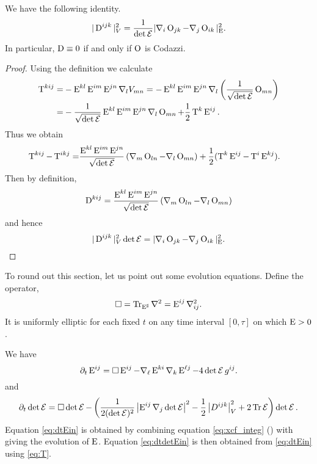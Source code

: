 \documentclass[a4paper,12pt]{amsart}
\begin{document}
\begin{lemma}
\label{lem:cubicform_codazzi}

We have the following identity.
\[
|\operatorname{D}^{ijk}|_V^2=\frac{1}{\det\operatorname{\mathcal{E}}}|\nabla_i\operatorname{O}_{jk}-\nabla_j\operatorname{O}_{ik}|_{\operatorname{E}}^2.
\]
In particular, \(\operatorname{D}\equiv 0\) if and only if \(\operatorname{O}\) is Codazzi.
\end{lemma}

\begin{proof}
Using the definition we calculate
\begin{align*}
\operatorname{T}^{kij}=&-\operatorname{E}^{kl}\operatorname{E}^{im}\operatorname{E}^{jn}\nabla_l V_{mn} = -\operatorname{E}^{kl}\operatorname{E}^{im}\operatorname{E}^{jn}\nabla_l \left(\frac{1}{\sqrt{\det\operatorname{\mathcal{E}}}} \operatorname{O}_{mn}\right)\\
=&-\frac{1}{\sqrt{\det\operatorname{\mathcal{E}}}}\operatorname{E}^{kl}\operatorname{E}^{im}\operatorname{E}^{jn}\nabla_l \operatorname{O}_{mn}+\frac{1}{2}\operatorname{T}^k\operatorname{E}^{ij}.
\end{align*}
Thus we obtain
\begin{align*}
\operatorname{T}^{kij}-\operatorname{T}^{ikj}=&\frac{\operatorname{E}^{kl}\operatorname{E}^{im}\operatorname{E}^{jn}}{\sqrt{\det\operatorname{\mathcal{E}}}}\left(\nabla_m \operatorname{O}_{ln}-\nabla_l \operatorname{O}_{mn}\right)+\frac{1}{2}(\operatorname{T}^k\operatorname{E}^{ij}-\operatorname{T}^i\operatorname{E}^{kj}).
\end{align*}
Then by definition,
\[
\operatorname{D}^{kij} = \frac{\operatorname{E}^{kl}\operatorname{E}^{im}\operatorname{E}^{jn}}{\sqrt{\det\operatorname{\mathcal{E}}}}\left(\nabla_m \operatorname{O}_{ln}-\nabla_l \operatorname{O}_{mn}\right)
\]
and hence
\[
|\operatorname{D}^{ijk}|_V^2\det\operatorname{\mathcal{E}} = |\nabla_i\operatorname{O}_{jk}-\nabla_j\operatorname{O}_{ik}|_{\operatorname{E}}^2.
\]
\end{proof}

To round out this section, let us point out some evolution equations. Define the operator,
\begin{equation}
\label{eq:box}
\Box = \operatorname{Tr}_{\operatorname{E}^{\sharp}} \nabla^2 = \operatorname{E}^{ij} \nabla^2_{ij}.
\end{equation}
It is uniformly elliptic for each fixed \(t\) on any time interval \([0, \tau]\) on which \(\operatorname{E} > 0\).

We have
\begin{equation}
\label{eq:dtEin}
\partial_t \operatorname{E}^{ij} = \Box \operatorname{E}^{ij} - \nabla_{\ell} \operatorname{E}^{ki} \nabla_k \operatorname{E}^{\ell j} - 4 \det \operatorname{\mathcal{E}} g^{ij}.
\end{equation}
and
\begin{equation}
\label{eq:dtdetEin}
\partial_t \det \operatorname{\mathcal{E}} = \Box \det \operatorname{\mathcal{E}} -\left(\frac{1}{2(\det\operatorname{\mathcal{E}})^2} \left\lvert{\operatorname{E}^{ij} \nabla_j \det \operatorname{\mathcal{E}}}\right\rvert^2 - \frac{1}{2}\left\lvert{D^{ijk}}\right\rvert_V^2 + 2\operatorname{Tr}\operatorname{\mathcal{E}}\right)\det \operatorname{\mathcal{E}}.
\end{equation}
Equation \eqref{eq:dtEin} is obtained by combining equation \eqref{eq:xcf_integ} (\cite[Lemma 1(a)]{MR2055396}) with \cite[Lemma 5]{MR2055396} giving the evolution of \(\operatorname{E}\). Equation \eqref{eq:dtdetEin} is then obtained from \eqref{eq:dtEin} using \eqref{eq:T}.
\end{document}
